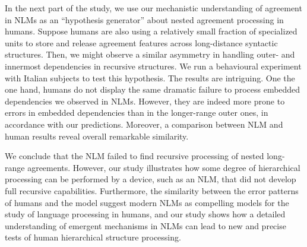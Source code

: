 In the next part of the study, we use our mechanistic understanding of
agreement in NLMs as an ``hypothesis generator''
\citep{Cichy:Kaiser:2019} about nested agreement processing in
humans. Suppose humans are also using a relatively small fraction of specialized units
to store and release agreement features across long-distance syntactic
structures. Then, we might observe a similar asymmetry in handling
outer- and innermost dependencies in recursive structures. We run a
behavioural experiment with Italian subjects to test this
hypothesis. The results are intriguing. One the one hand, humans do
not display the same dramatic failure to process embedded dependencies we observed in NLMs. However, they are indeed more prone to errors in embedded dependencies than in the longer-range outer ones, in accordance with our predictions. Moreover, a comparison between NLM and human results reveal overall remarkable similarity. 

We conclude that the NLM failed to find recursive processing of nested long-range agreements. However, our study illustrates how some degree of hierarchical processing can be performed by a device, such as an NLM, that did not develop full recursive capabilities. Furthermore, the similarity between the error patterns of humans and the model suggest modern NLMs as compelling models for the study of language processing in humans, and our study shows how a detailed understanding of emergent mechanisms in NLMs can lead to new and precise tests of human hierarchical structure processing. 







